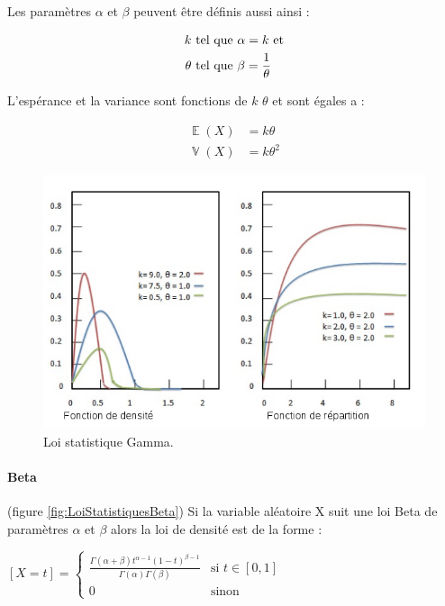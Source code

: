 \documentclass[a4paper,12pt]{report}
\DeclareMathOperator{\E}{\mathbb{E}} %
\DeclareMathOperator{\V}{\mathbb{V}} %
\theoremstyle{plain}				%
\theoremstyle{definition}				%
\begin{document}
Les paramètres $\alpha$ et $\beta$ peuvent être définis aussi ainsi :

   
\begin{align*}
   k 		& \textnormal{ tel que } \alpha = k  \textnormal{ et} \\
   \theta 	& \textnormal{ tel que } \beta  = \frac{1}{\theta}
\end{align*}

L’espérance et la variance sont fonctions de $k$ $\theta$ et sont égales a :

\begin{align*}
	\E(X) &= k \theta \\
	\V(X) &= k \theta ^2
\end{align*}

\begin{figure}
{\centering
\includegraphics[width=\columnwidth]{loiStatGamma.png}
\caption{Loi statistique Gamma.}
\label{fig:LoiStatistiquesGamma}
\par}
\end{figure}

\paragraph{Beta} (figure \ref{fig:LoiStatistiquesBeta})
Si la variable aléatoire X suit une loi Beta de paramètres $\alpha$ et $\beta$ alors la loi de densité est de la forme :
  \begin{center}
  $[X=t] = \left\{
    \begin{array}{ll}
    \frac{\Gamma(\alpha + \beta) t^{\alpha-1} (1-t)^{\beta-1}}{\Gamma(\alpha) \Gamma(\beta)}
    & 
   	\mbox{si } t \in [0,1]  \\
        0 & 
        \mbox{sinon}
    \end{array}
	\right.$
  \label{definitionLoiBetaDensite}
  \end{center}
 
\end{document}
